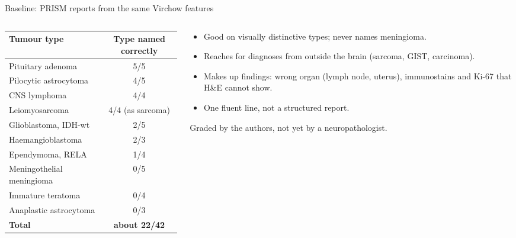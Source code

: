 \documentclass[aspectratio=169,11pt]{beamer}
\newcommand{\aside}[1]{{\color{muted}\small #1}}
\begin{document}
\begin{frame}{Baseline: PRISM reports from the same Virchow features}
  \begin{columns}[T]
    \begin{column}{0.5\textwidth}
      \small
      \begin{tabular}{@{}lc@{}}
        \toprule
        Tumour type & Type named correctly\\
        \midrule
        Pituitary adenoma & 5/5\\
        Pilocytic astrocytoma & 4/5\\
        CNS lymphoma & 4/4\\
        Leiomyosarcoma & 4/4 (as sarcoma)\\
        Glioblastoma, IDH-wt & 2/5\\
        Haemangioblastoma & 2/3\\
        Ependymoma, RELA & 1/4\\
        Meningothelial meningioma & 0/5\\
        Immature teratoma & 0/4\\
        Anaplastic astrocytoma & 0/3\\
        \midrule
        \textbf{Total} & \textbf{about 22/42}\\
        \bottomrule
      \end{tabular}
    \end{column}
    \begin{column}{0.47\textwidth}
      \begin{itemize}
        \item Good on visually distinctive types; never names meningioma.
        \item Reaches for diagnoses from outside the brain (sarcoma, GIST, carcinoma).
        \item \alert{Makes up findings}: wrong organ (lymph node, uterus), immunostains and Ki-67 that H\&E cannot show.
        \item One fluent line, not a structured report.
      \end{itemize}
      \aside{Graded by the authors, not yet by a neuropathologist.}
    \end{column}
  \end{columns}
\end{frame}
\end{document}
